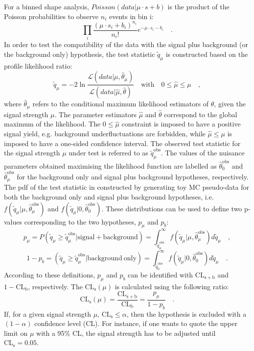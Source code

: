 For a binned shape analysis, $Poisson(data|\mu\cdot s + b)$ is the product of the Poisson probabilities to observe $n_i$ events in bin i:
\begin{equation}
\prod_i \frac{(\mu\cdot s_i + b_i)^{n_i}}{n_i !} e^{-\mu\cdot s_i - b_i} \quad.
\end{equation}
In order to test the compatibility of the data with the signal plus background (or the background only) hypothesis, the test statistic $\tilde{q}_\mu$ is constructed based on the profile likelihood ratio:
\begin{equation}
\tilde{q}_\mu = -2 \ln{\frac{\mathcal{L}(data|\mu,\hat{\theta}_\mu)}{\mathcal{L}(data|\hat{\mu},\hat{\theta})	}}  \quad \mathrm{with} \quad 0 \leq \hat{\mu} \leq \mu \quad ,
\end{equation}
where $\hat{\theta}_\mu$ refers to the conditional maximum likelihood estimators of $\theta$, given the signal strength $\mu$. The parameter estimators $\hat{\mu}$ and $\hat{\theta}$ correspond to the global maximum of the likelihood. The $0 \leq \hat{\mu}$ constraint is imposed to have a positive signal yield, e.g. background underfluctuations are forbidden, while $\hat{\mu} \leq \mu$ is imposed to have a one-sided confidence interval. The observed test statistic for the signal strength $\mu$ under test is referred to as $\tilde{q}_\mu^\mathrm{obs}$. The values of the nuisance parameters obtained maximising the likelihood function are labelled as $\hat{\theta}_0^\mathrm{obs}$ and $\hat{\theta}_\mu^\mathrm{obs}$ for the background only and signal plus background hypotheses, respectively. The pdf of the test statistic in constructed by generating toy MC pseudo-data for both the background only and signal plus background hypotheses, i.e. $f(\tilde{q}_\mu|\mu,\hat{\theta}_\mu^\mathrm{obs})$ and $f(\tilde{q}_\mu|0,\hat{\theta}_0^\mathrm{obs})$. These distributions can be used to define two p-values corresponding to the two hypotheses, $p_\mu$ and $p_b$:
\begin{equation}
p_\mu = P(\tilde{q}_\mu \geq \tilde{q}_\mu^\mathrm{obs}|\mathrm{signal+background}) = \int_{\tilde{q}_\mu^\mathrm{obs}}^{\infty} f(\tilde{q}_\mu|\mu,\hat{\theta}_\mu^\mathrm{obs}) d\tilde{q}_\mu \quad ,
\end{equation}
\begin{equation}
1 - p_b = (\tilde{q}_\mu \geq \tilde{q}_\mu^\mathrm{obs}|\mathrm{background~only}) = \int_{\tilde{q}_0^\mathrm{obs}}^{\infty} f(\tilde{q}_\mu|0,\hat{\theta}_0^\mathrm{obs}) d\tilde{q}_\mu \quad .
\end{equation}
According to these definitions, $p_\mu$ and $p_b$ can be identified with $\mathrm{CL_{s+b}}$ and $1-\mathrm{CL_b}$, respectively.
The $\mathrm{CL_s}(\mu)$ is calculated using the following ratio:
\begin{equation}
\mathrm{CL_s}(\mu) = \frac{\mathrm{CL_{s+b}}}{\mathrm{CL_b}} = \frac{p_\mu}{1-p_b} \quad .
\end{equation}
If, for a given signal strength $\mu$, $\mathrm{CL_s} \leq \alpha$, then the hypothesis is excluded with a $(1-\alpha)$ confidence level (CL). For instance, if one wants to quote the upper limit on $\mu$ with a 95\% CL, the signal strength has to be adjusted until $\mathrm{CL_s} = 0.05$.

